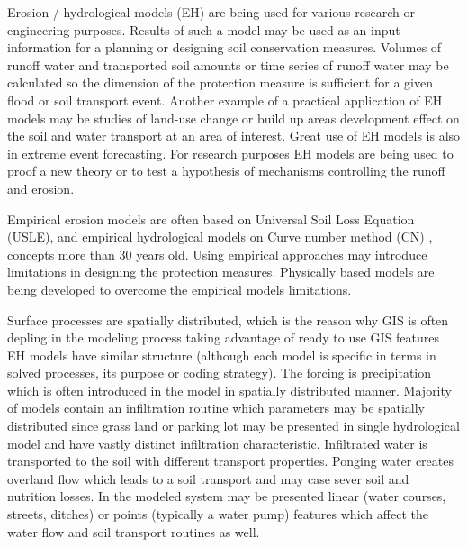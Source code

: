 Erosion / hydrological models (EH) are being used for various research or engineering purposes. Results of such a model may be used as an input information for a planning or designing soil conservation measures. Volumes of runoff water and transported soil amounts or time series of runoff water may be calculated so the dimension of the protection measure is sufficient for a given flood or soil transport event. Another example of a practical application of EH models may be studies of land-use change or build up areas development effect on the soil and water transport at an area of interest. Great use of EH models is also in extreme event forecasting. For research purposes EH models are being used to proof a new theory or to test a hypothesis of mechanisms controlling the runoff and erosion.

Empirical erosion models are often based on Universal Soil Loss Equation (USLE), \cite{wischmeier1978,renard1997} and empirical hydrological models on Curve number method (CN) \cite{cronshey1986}, concepts more than 30 years old. Using empirical approaches may introduce limitations in designing the protection measures. Physically based models are being developed to overcome the empirical models limitations. 

Surface processes are spatially distributed, which is the reason why GIS is often depling in the modeling process taking advantage of ready to use GIS features EH models have similar structure (although each model is specific in terms in solved processes, its purpose or coding strategy). The forcing is precipitation which is often introduced in the model in spatially distributed manner. Majority of models contain an infiltration routine which parameters may be spatially distributed since grass land or parking lot may be presented in single hydrological model and have vastly distinct infiltration characteristic. Infiltrated water is transported to the soil with different transport properties. Ponging water creates overland flow which leads to a soil transport and may case sever soil and nutrition losses. In the modeled system may be presented linear (water courses, streets, ditches) or points (typically a water pump) features which affect the water flow and soil transport routines as well. 


